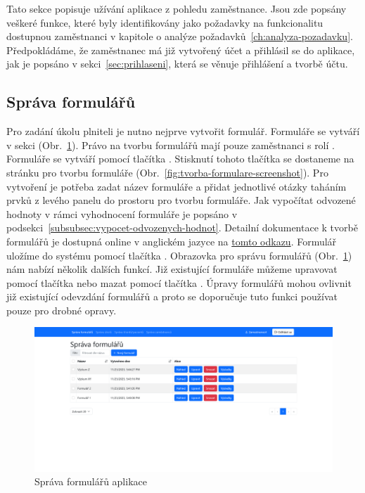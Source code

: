 Tato sekce popisuje užívání aplikace z pohledu zaměstnance.
Jsou zde popsány veškeré funkce, které byly identifikovány jako požadavky na funkcionalitu dostupnou zaměstnanci v kapitole o analýze požadavků~\ref{ch:analyza-pozadavku}.
Předpokládáme, že zaměstnanec má již vytvořený účet a přihlásil se do aplikace, jak je popsáno v sekci~\ref{sec:prihlaseni}, která se věnuje přihlášení a tvorbě účtu.

\subsection{Správa formulářů}\label{subsec:sprava-formularu}

Pro zadání úkolu plniteli je nutno nejprve vytvořit formulář.
Formuláře se vytváří v sekci  (Obr.~\ref{fig:sprava-formularu-screenshot}).
Právo na tvorbu formulářů mají pouze zaměstnanci s rolí .
Formuláře se vytváří pomocí tlačítka .
Stisknutí tohoto tlačítka se dostaneme na stránku pro tvorbu formuláře (Obr.~\ref{fig:tvorba-formulare-screenshot}).
Pro vytvoření je potřeba zadat název formuláře a přidat jednotlivé otázky taháním prvků z levého panelu do prostoru pro tvorbu formuláře.
Jak vypočítat odvozené hodnoty v rámci vyhodnocení formuláře je popsáno v podsekci~\ref{subsubsec:vypocet-odvozenych-hodnot}.
Detailní dokumentace k tvorbě formulářů je dostupná online v anglickém jazyce na \href{https://help.form.io/userguide/form-building}{tomto odkazu}.
Formulář uložíme do systému pomocí tlačítka .
Obrazovka pro správu formulářů (Obr.~\ref{fig:sprava-formularu-screenshot}) nám nabízí několik dalších funkcí.
Již existující formuláře můžeme upravovat pomocí tlačítka  nebo mazat pomocí tlačítka .
Úpravy formulářů mohou ovlivnit již existující odevzdání formulářů a proto se doporučuje tuto funkci používat pouze pro drobné opravy.

\begin{figure}[H]
    \includegraphics[width=\textwidth]{../img/screenshots/sprava-formularu}
    \caption{Správa formulářů aplikace}\label{fig:sprava-formularu-screenshot}
\end{figure}

